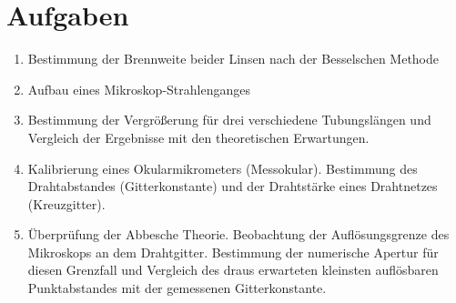 \documentclass[a4paper,german,12pt,smallheadings]{scrartcl}
\begin{document}

\section{Aufgaben}
\begin{enumerate}
  \item Bestimmung der Brennweite beider Linsen nach der Besselschen Methode
  \item Aufbau eines Mikroskop-Strahlenganges
  \item Bestimmung der Vergrößerung für drei verschiedene Tubungslängen und
    Vergleich der Ergebnisse mit den theoretischen Erwartungen.
  \item Kalibrierung eines Okularmikrometers (Messokular). Bestimmung des
    Drahtabstandes (Gitterkonstante) und der Drahtstärke eines Drahtnetzes
    (Kreuzgitter).
  \item Überprüfung der Abbesche Theorie. Beobachtung der Auflösungsgrenze des
    Mikroskops an dem Drahtgitter. Bestimmung der numerische Apertur für diesen
    Grenzfall und Vergleich des draus erwarteten kleinsten auflösbaren
    Punktabstandes mit der gemessenen Gitterkonstante.
\end{enumerate}
\end{document}
